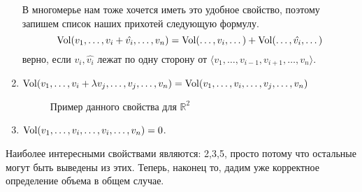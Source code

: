 \begin{enumerate}
         В многомерье нам тоже хочется иметь это удобное свойство, поэтому запишем
         список наших прихотей следующую формулу.
         \[
             \operatorname{Vol}(v_1,\dots, v_i + \hat{v_i}, \dots, v_n) = \operatorname{Vol}(\dots, v_i, \dots) + \operatorname{Vol}(\dots,\hat{v_i},\dots)
         \]
         верно, если $v_i, \hat{v_i}$ лежат по одну сторону от $\langle v_1, \dots, v_{i - 1}, v_{i + 1}, \dots, v_n\rangle$.
     \item $\operatorname{Vol}(v_1,\dots, v_i + \lambda v_j, \dots, v_j, \dots, v_n) 
         = \operatorname{Vol}(v_1,\dots, v_i,\dots, v_j, \dots, v_n)$ 
        \begin{figure}[H]
            \centering
            \caption{Пример данного свойства для $\mathbb{R}^2$}
            \label{fig:3}
        \end{figure}
     \item $\operatorname{Vol}(v_1,\dots, v_i, \dots, v_i, \dots, v_n) = 0$.
\end{enumerate}

Наиболее интересными свойствами являются: 2,3,5, просто потому что остальные могут быть выведены из этих.
Теперь, наконец то, дадим уже корректное определение объема в общем случае.

